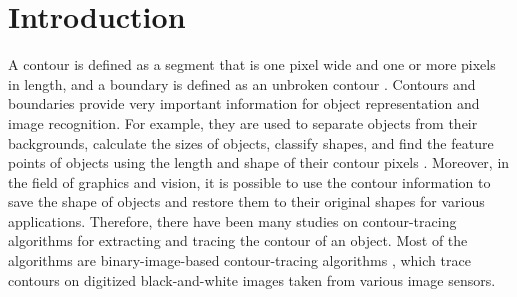 
\section{Introduction}


A contour is defined as a segment that is one pixel wide and one or more pixels in length, and a boundary is defined as an unbroken contour \cite{Mcqueen2004Contour}. Contours and boundaries provide very important information for object representation and image recognition. For example, they are used to separate objects from their backgrounds, calculate the sizes of objects, classify shapes, and find the feature points of objects using the length and shape of their contour pixels \cite{Pratt????Digital,Gose1996Pattern}. Moreover, in the field of graphics and vision, it is possible to use the contour information to save the shape of objects and restore them to their original shapes for various applications. Therefore, there have been many studies on contour-tracing algorithms for extracting and tracing the contour of an object. Most of the algorithms are binary-image-based contour-tracing algorithms \cite{Pitas2000Digital,Gose1996Pattern,Das1990Bivariate,Papert1973Uses,Cheong2006Improved,Mirante1982Radial,Pavlidis2012Algorithms}, which trace contours on digitized black-and-white images taken from various image sensors.

